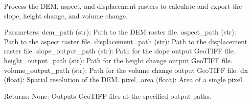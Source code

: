 \documentclass[letterpaper,10pt,english]{sphinxmanual}
\begin{document}

\begin{fulllineitems}
\label{\detokenize{akhdefo_functions:akhdefo_functions.Akhdefo_Tools.displacement_to_volume}}
\pysigstartsignatures
{}
\pysigstopsignatures
\sphinxAtStartPar
Process the DEM, aspect, and displacement rasters to calculate and export the slope, height change, and volume change.

\sphinxAtStartPar
Parameters:
dem\_path (str): Path to the DEM raster file.
aspect\_path (str): Path to the aspect raster file.
displacement\_path (str): Path to the displacement raster file.
slope\_output\_path (str): Path for the slope output GeoTIFF file.
height\_output\_path (str): Path for the height change output GeoTIFF file.
volume\_output\_path (str): Path for the volume change output GeoTIFF file.
dx (float): Spatial resolution of the DEM.
pixel\_area (float): Area of a single pixel.

\sphinxAtStartPar
Returns:
None: Outputs GeoTIFF files at the specified output paths.

\end{fulllineitems}


\begin{fulllineitems}
\label{\detokenize{akhdefo_functions:akhdefo_functions.Akhdefo_Tools.flip_geotiff_180}}
\pysigstartsignatures
{}
\pysigstopsignatures
\end{fulllineitems}
\end{document}
